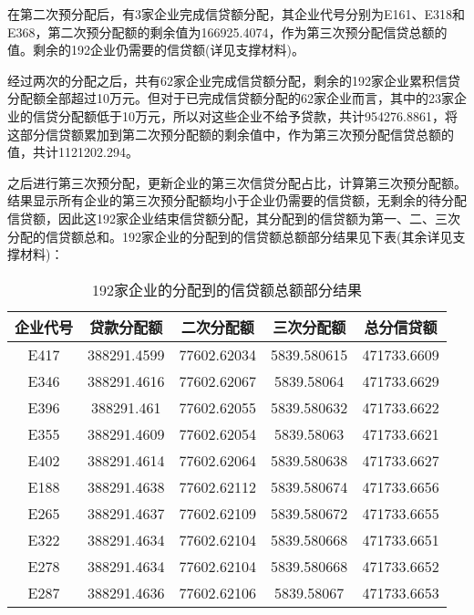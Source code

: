 \documentclass{cumcmthesis}
\begin{document}
在第二次预分配后，有3家企业完成信贷额分配，其企业代号分别为E161、E318和E368，第二次预分配额的剩余值为166925.4074，作为第三次预分配信贷总额的值。剩余的192企业仍需要的信贷额(详见支撑材料)。

经过两次的分配之后，共有62家企业完成信贷额分配，剩余的192家企业累积信贷分配额全部超过10万元。但对于已完成信贷额分配的62家企业而言，其中的23家企业的信贷分配额低于10万元，所以对这些企业不给予贷款，共计954276.8861，将这部分信贷额累加到第二次预分配额的剩余值中，作为第三次预分配信贷总额的值，共计1121202.294。

之后进行第三次预分配，更新企业的第三次信贷分配占比，计算第三次预分配额。结果显示所有企业的第三次预分配额均小于企业仍需要的信贷额，无剩余的待分配信贷额，因此这192家企业结束信贷额分配，其分配到的信贷额为第一、二、三次分配的信贷额总和。192家企业的分配到的信贷额总额部分结果见下表(其余详见支撑材料)：

\begin{table}[H]   %
	\caption{192家企业的分配到的信贷额总额部分结果}\label{tab:26} \centering
	\begin{tabular}{ccccc}
		\toprule[1.5pt]
企业代号 & 贷款分配额       & 二次分配额       & 三次分配额       & 总分信贷额       \\
		\midrule[1pt]
E417 & 388291.4599 & 77602.62034 & 5839.580615 & 471733.6609 \\
E346 & 388291.4616 & 77602.62067 & 5839.58064  & 471733.6629 \\
E396 & 388291.461  & 77602.62055 & 5839.580632 & 471733.6622 \\
E355 & 388291.4609 & 77602.62054 & 5839.58063  & 471733.6621 \\
E402 & 388291.4614 & 77602.62064 & 5839.580638 & 471733.6627 \\
E188 & 388291.4638 & 77602.62112 & 5839.580674 & 471733.6656 \\
E265 & 388291.4637 & 77602.62109 & 5839.580672 & 471733.6655 \\
E322 & 388291.4634 & 77602.62104 & 5839.580668 & 471733.6651 \\
E278 & 388291.4634 & 77602.62104 & 5839.580668 & 471733.6652 \\
E287 & 388291.4636 & 77602.62106 & 5839.58067  & 471733.6653 \\
\bottomrule[1.5pt]
\end{tabular}
\end{table}
\end{document}

